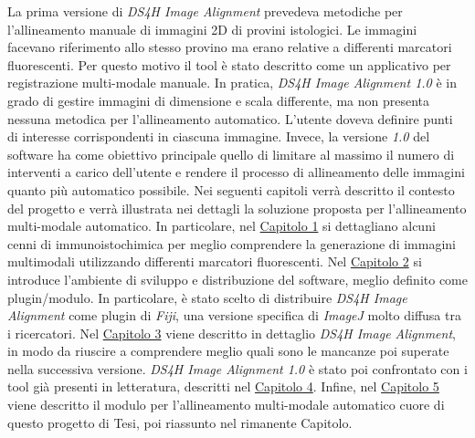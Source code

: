     \noindent La prima versione di \textit{DS4H Image Alignment} prevedeva metodiche per l’allineamento manuale di immagini 2D di provini istologici. Le immagini facevano riferimento allo stesso provino ma erano relative a differenti marcatori fluorescenti. Per questo motivo il tool è stato descritto come un applicativo per registrazione multi-modale manuale. In pratica, \textit{DS4H Image Alignment 1.0} è in grado di gestire immagini di dimensione e scala differente, ma non presenta nessuna metodica per l’allineamento automatico. L’utente doveva definire punti di interesse corrispondenti in ciascuna immagine. Invece, la versione \textit{1.0} del software ha come obiettivo principale quello di limitare al massimo il numero di interventi a carico dell'utente e rendere il processo di allineamento delle immagini quanto più automatico possibile.\hfill \break
    \noindent Nei seguenti capitoli verrà descritto il contesto del progetto e verrà illustrata nei dettagli la soluzione proposta per l’allineamento multi-modale automatico. In particolare, nel \hyperref[chap:histology]{Capitolo 1} si dettagliano alcuni cenni di immunoistochimica per meglio comprendere la generazione di immagini multimodali utilizzando differenti marcatori fluorescenti. Nel \hyperref[chap:plugins]{Capitolo 2} si introduce l’ambiente di sviluppo e distribuzione del software, meglio definito come plugin/modulo. In particolare, è stato scelto di distribuire \textit{DS4H Image Alignment} come plugin di \textit{Fiji}, una versione specifica di \textit{ImageJ} molto diffusa tra i ricercatori. Nel \hyperref[chap:descriptionoldtool]{Capitolo 3} viene descritto in dettaglio \textit{DS4H Image Alignment}, in modo da riuscire a comprendere meglio quali sono le mancanze poi superate nella successiva versione. \textit{DS4H Image Alignment 1.0} è stato poi confrontato con i tool già presenti in letteratura, descritti nel \hyperref[chap:competitors]{Capitolo 4}. Infine, nel \hyperref[chap:descriptionnewtool]{Capitolo 5} viene descritto il modulo per l’allineamento multi-modale automatico cuore di questo progetto di Tesi, poi riassunto nel rimanente Capitolo.